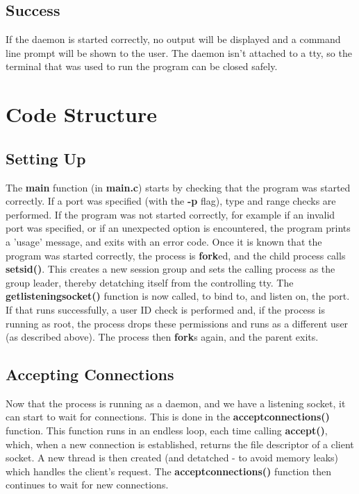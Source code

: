 \documentclass[a4paper]{article}
\begin{document}
\subsection{Success}
If the daemon is started correctly, no output will be displayed and a command
line prompt will be shown to the user. The daemon isn't attached to a tty, so
the terminal that was used to run the program can be closed safely.

\section{Code Structure}

\subsection{Setting Up}
The \textbf{main} function (in \textbf{main.c}) starts by checking that the
program was started correctly. If a port was specified (with the \textbf{-p}
flag), type and range checks are performed. If the program was not started
correctly, for example if an invalid port was specified, or if an unexpected
option is encountered, the program prints a 'usage' message, and exits with an
error code. Once it is known that the program was started correctly, the process
is \textbf{fork}ed, and the child process calls \textbf{setsid()}. This creates
a new session group and sets the calling process as the group leader, thereby
detatching itself from the controlling tty. The \textbf{getlisteningsocket()}
function is now called, to bind to, and listen on, the port. If that runs
successfully, a user ID check is performed and, if the process is running as
root, the process drops these permissions and runs as a different user (as
described above). The process then \textbf{fork}s again, and the parent exits.

\subsection{Accepting Connections}
Now that the process is running as a daemon, and we have a listening socket, it
can start to wait for connections. This is done in the
\textbf{acceptconnections()} function. This function runs in an endless loop,
each time calling \textbf{accept()}, which, when a new connection is
established, returns the file descriptor of a client socket. A new thread is
then created (and detatched - to avoid memory leaks) which handles the client's
request. The \textbf{acceptconnections()} function then continues to wait for
new connections.
\end{document}
